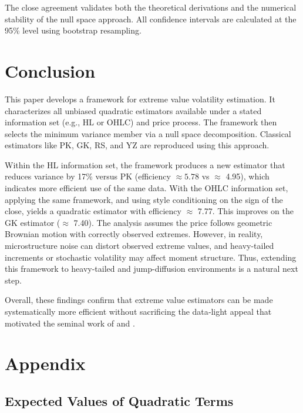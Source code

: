 The close agreement validates both the theoretical derivations and the numerical stability of the null space approach. All confidence intervals are calculated at the 95\% level using bootstrap resampling.

\section{Conclusion}
\label{sec:Conclusion}

This paper develops a framework for extreme value volatility estimation. It characterizes all unbiased quadratic estimators available under a stated information set (e.g., HL or OHLC) and price process. The framework then selects the minimum variance member via a null space decomposition. Classical estimators like PK, GK, RS, and YZ are reproduced using this approach.

Within the HL information set, the framework produces a new estimator that reduces variance by 17\% versus PK (efficiency $\approx 5.78$ vs $\approx$ 4.95), which indicates more efficient use of the same data. With the OHLC information set, applying the same framework, and using \citet{meilijson2009GarmanKlassVolatilityEstimator} style conditioning on the sign of the close, yields a quadratic estimator with efficiency $\approx$ 7.77. This improves on the GK estimator ($\approx$ 7.40). The analysis assumes the price follows geometric Brownian motion with correctly observed extremes. However, in reality, microstructure noise can distort observed extreme values, and heavy-tailed increments or stochastic volatility may affect moment structure. Thus, extending this framework to heavy-tailed and jump-diffusion environments is a natural next step.

Overall, these findings confirm that extreme value estimators can be made systematically more efficient without sacrificing the data‑light appeal that motivated the seminal work of \citet{parkinson1980ExtremeValueMethod} and \citet{garman1980EstimationSecurityPrice}. 

\newpage



\newpage

\appendix
\section{Appendix}
\label{sec:appendix}

\subsection{Expected Values of Quadratic Terms}

